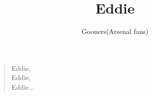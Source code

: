 \documentclass[a4paper,12pt]{article}
\title{Eddie}
\author{Gooners(Arsenal fans)}
\date{}
\begin{document}
	
	\maketitle
	
	\begin{verse}
		
		Eddie, \\
		Eddie, \\
		Eddie$\ldots$
		
	\end{verse}
	
\end{document}
